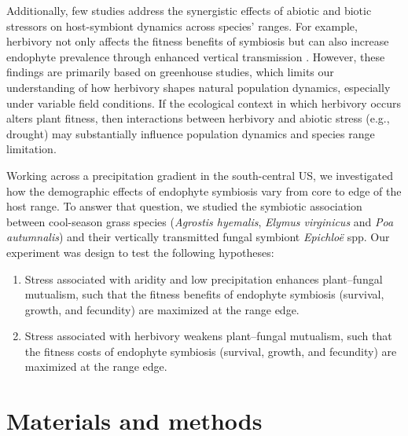 \documentclass[12pt]{article}\usepackage[]{graphicx}\usepackage[dvipsnames]{xcolor}
\begin{document}
Additionally, few studies address the synergistic effects of abiotic and biotic stressors on host-symbiont dynamics across species’ ranges.
For example, herbivory not only affects the fitness benefits of symbiosis but can also increase endophyte prevalence through enhanced vertical transmission \citep{gundel2020simulated, agrawal1999transgenerational}.
However, these findings are primarily based on greenhouse studies, which limits our understanding of how herbivory shapes natural population dynamics, especially under variable field conditions.
If the ecological context in which herbivory occurs alters plant fitness, then interactions between herbivory and abiotic stress (e.g., drought) may substantially influence population dynamics and species range  limitation.

Working across a precipitation gradient in the south-central US, we investigated  how the demographic effects of endophyte symbiosis vary from core to edge of the host range.
To answer that question, we studied the symbiotic association between cool-season grass species (\emph{Agrostis hyemalis}, \emph{Elymus virginicus} and \emph{Poa autumnalis}) and their  vertically transmitted fungal symbiont \emph{Epichloë} spp. 
Our experiment was design to test the following hypotheses:
\begin{enumerate}
    \item Stress associated with aridity and low precipitation enhances plant–fungal mutualism, such that the fitness benefits of endophyte symbiosis (survival, growth, and fecundity) are maximized at the range edge.
    \item Stress associated with herbivory weakens plant–fungal mutualism, such that the fitness costs of endophyte symbiosis (survival, growth, and fecundity) are maximized at the range edge.
\end{enumerate}
\section*{Materials and methods}
\end{document}
